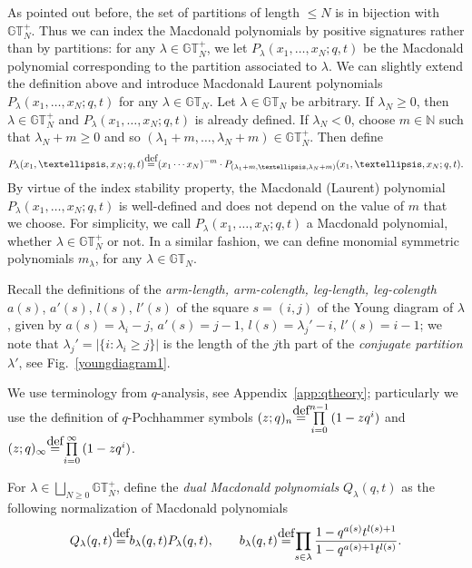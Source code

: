 \documentclass[11pt]{article}
\numberwithin{equation}{section}
\newcommand\myeq{\mathrel{\stackrel{\makebox[0pt]{\mbox{\normalfont\tiny def}}}{=}}}
\newcommand{\N}{\mathbb{N}}
\newcommand{\GT}{\mathbb{GT}}
\newcommand{\GTp}{\mathbb{GT}^+}
\begin{document}
As pointed out before, the set of partitions of length $\leq N$ is in bijection with $\GTp_N$. Thus we can index the Macdonald polynomials by positive signatures rather than by partitions: for any $\lambda\in\GTp_N$, we let $P_{\lambda}(x_1, \dots, x_N; q, t)$ be the Macdonald polynomial corresponding to the partition associated to $\lambda$. We can slightly extend the def\/inition above and introduce Macdonald Laurent polynomials $P_{\lambda}(x_1, \dots, x_N; q, t)$ for any $\lambda\in\GT_N$. Let $\lambda\in\GT_N$ be arbitrary. If $\lambda_N \geq 0$, then $\lambda\in\GTp_N$ and $P_{\lambda}(x_1, \dots, x_N; q, t)$ is already def\/ined. If $\lambda_N < 0$, choose $m\in\N$ such that $\lambda_N + m \geq 0$ and so $(\lambda_1 + m, \dots, \lambda_N + m)\in\GTp_N$. Then def\/ine
\begin{gather}\label{macdonaldsignatures11}
P_{\lambda}(x_1, \dots, x_N; q, t) \myeq (x_1\cdots x_N)^{-m}\cdot P_{(\lambda_1 + m, \dots, \lambda_N + m)}(x_1, \dots, x_N; q, t).
\end{gather}
By virtue of the index stability property, the Macdonald (Laurent) polynomial $P_{\lambda}(x_1, \dots, x_N; q, t)$ is well-def\/ined and does not depend on the value of $m$ that we choose. For simplicity, we call $P_{\lambda}(x_1, \dots, x_N; q, t)$ a Macdonald polynomial, whether $\lambda\in\GTp_N$ or not. In a similar fashion, we can def\/ine monomial symmetric polynomials $m_{\lambda}$, for any $\lambda\in\GT_N$.

Recall the def\/initions of the \textit{arm-length, arm-colength, leg-length, leg-colength} $a(s)$, $a'(s)$, $l(s)$, $l'(s)$ of the square $s = (i, j)$ of the Young diagram of $\lambda$, given by $a(s) = \lambda_i - j$, $a'(s) = j - 1$, $l(s) = \lambda_j' - i$, $l'(s) = i - 1$;
we note that $\lambda_j' = |\{ i\colon \lambda_i \geq j \} |$ is the length of the $j$th part of the \textit{conjugate partition} $\lambda'$, see Fig.~\ref{youngdiagram1}.

We use terminology from $q$-analysis, see Appendix~\ref{app:qtheory}; particularly we use the def\/inition of $q$-Pochhammer symbols $(z; q)_n \myeq \prod\limits_{i=0}^{n-1}{(1 - zq^i)}$ and $(z; q)_{\infty} \myeq \prod\limits_{i=0}^{\infty}{(1 - zq^i)}$.

For $\lambda\in\bigsqcup\limits_{N\geq 0}{\GTp_N}$, def\/ine the \textit{dual Macdonald polynomials} $Q_{\lambda}(q, t)$ as the following normaliza\-tion of Macdonald polynomials
\begin{gather}\label{PtoQ}
Q_{\lambda}(q, t) \myeq b_{\lambda}(q, t)P_{\lambda}(q, t), \qquad b_{\lambda}(q, t) \myeq \prod_{s\in\lambda}{\frac{1 - q^{a(s)}t^{l(s) + 1}}{1 - q^{a(s) + 1}t^{l(s)}}}.
\end{gather}
\end{document}
